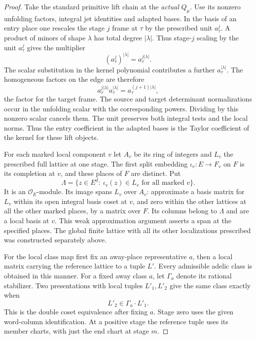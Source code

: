 \begin{proof}
Take the standard primitive lift chain at the \emph{actual}
\(Q_\mu\). Use its nonzero unfolding factors, integral jet
identities and adapted bases. In the basis of an entry place one
rescales the stage \(j\) frame at \(\tau\) by the prescribed unit
\(a_\tau^j\). A product of minors of shape \(\lambda\) has total degree \(|\lambda|\). Thus stage-\(j\) scaling by the unit \(a_\tau^j\) gives the multiplier
\[
 (a_\tau^j)^{|\lambda|}=a_\tau^{j|\lambda|}.
\] The scalar substitution in the kernel polynomial contributes a further
\(a_\tau^{|\lambda|}\). The homogeneous factors on the edge are therefore
\[
 a_\tau^{j|\lambda|}a_\tau^{|\lambda|}
        =a_\tau^{(j+1)|\lambda|},
\]
the factor for the target frame. The source and target determinant
normalizations occur in the unfolding scalar with the
corresponding powers. Dividing by this nonzero scalar cancels
them. The unit preserves both integral tests and the local norms.
Thus the entry coefficient in the adapted bases is the Taylor
coefficient of the kernel for these lift objects.
\label{cor:level-four-core-8}

For each marked local component \(v\) let \(A_v\) be its ring
of integers and \(L_v\) the prescribed full lattice at one
stage. The first split embedding \(\iota_v:E\to F_v\) on \(F\)
is its completion at \(v\), and these places of \(F\) are
distinct. Put
\[
 \Lambda=\{z\in E^d:\ \iota_v(z)\in L_v\text{ for all marked }v\}.
\]
It is an \(\mathcal O_E\)-module. Its image spans \(L_v\) over
\(A_v\): approximate a basis matrix for \(L_v\) within its
open integral basis coset at \(v\), and zero within the other
lattices at all the other marked places, by a matrix over \(F\).
Its columns belong to \(\Lambda\) and are a local basis at \(v\).
This weak approximation argument asserts a span at the specified
places. The global finite lattice with all its other localizations
prescribed was constructed separately above.

For the local class map first fix an away-place representative
\(a\), then a local matrix carrying the reference lattice to
a tuple \(L'\). Every admissible adelic class is obtained in
this manner. For a fixed away class \(a\), let \(\Gamma_a\) denote its rational stabilizer. Two presentations with local tuples \(L'_1,L'_2\) give the same class exactly when
\[
 L'_2\in\Gamma_a\cdot L'_1 .
\] This is the double
coset equivalence after fixing \(a\). Stage zero uses the given
word-column identification. At a positive stage the reference
tuple uses its member charts, with just the end chart at stage
\(m\).


\end{proof}
